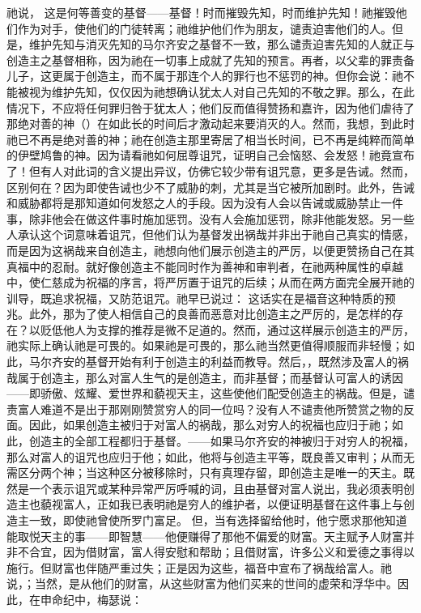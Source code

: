 祂说，  这是何等善变的基督——基督！时而摧毁先知，时而维护先知！祂摧毁他们作为对手，使他们的门徒转离；祂维护他们作为朋友，谴责迫害他们的人。但是，维护先知与消灭先知的马尔齐安之基督不一致，那么谴责迫害先知的人就正与创造主之基督相称，因为祂在一切事上成就了先知的预言。再者，以父辈的罪责备儿子，这更属于创造主，而不属于那连个人的罪行也不惩罚的神。但你会说：祂不能被视为维护先知，仅仅因为祂想确认犹太人对自己先知的不敬之罪。那么，在此情况下，不应将任何罪归咎于犹太人；他们反而值得赞扬和嘉许，因为他们虐待了那绝对善的神（）在如此长的时间后才激动起来要消灭的人。然而，我想，到此时祂已不再是绝对善的神；祂在创造主那里寄居了相当长时间，已不再是纯粹而简单的伊壁鸠鲁的神。因为请看祂如何屈尊诅咒，证明自己会恼怒、会发怒！祂竟宣布了！但有人对此词的含义提出异议，仿佛它较少带有诅咒意，更多是告诫。然而，区别何在？因为即使告诫也少不了威胁的刺，尤其是当它被所加剧时。此外，告诫和威胁都将是那知道如何发怒之人的手段。因为没有人会以告诫或威胁禁止一件事，除非他会在做这件事时施加惩罚。没有人会施加惩罚，除非他能发怒。另一些人承认这个词意味着诅咒，但他们认为基督发出祸哉并非出于祂自己真实的情感，而是因为这祸哉来自创造主，祂想向他们展示创造主的严厉，以便更赞扬自己在其真福中的忍耐。就好像创造主不能同时作为善神和审判者，在祂两种属性的卓越中，使仁慈成为祝福的序言，将严厉置于诅咒的后续；从而在两方面完全展开祂的训导，既追求祝福，又防范诅咒。祂早已说过：  这话实在是福音这种特质的预兆。此外，那为了使人相信自己的良善而恶意对比创造主之严厉的，是怎样的存在？以贬低他人为支撑的推荐是微不足道的。然而，通过这样展示创造主的严厉，祂实际上确认祂是可畏的。如果祂是可畏的，那么祂当然更值得顺服而非轻慢；如此，马尔齐安的基督开始有利于创造主的利益而教导。然后，，既然涉及富人的祸哉属于创造主，那么对富人生气的是创造主，而非基督；而基督认可富人的诱因——即骄傲、炫耀、爱世界和藐视天主，这些使他们配受创造主的祸哉。但是，谴责富人难道不是出于那刚刚赞赏穷人的同一位吗？没有人不谴责他所赞赏之物的反面。因此，如果创造主被归于对富人的祸哉，那么对穷人的祝福也应归于祂；如此，创造主的全部工程都归于基督。——如果马尔齐安的神被归于对穷人的祝福，那么对富人的诅咒也应归于他；如此，他将与创造主平等，既良善又审判；从而无需区分两个神；当这种区分被移除时，只有真理存留，即创造主是唯一的天主。既然是一个表示诅咒或某种异常严厉呼喊的词，且由基督对富人说出，我必须表明创造主也藐视富人，正如我已表明祂是穷人的维护者，以便证明基督在这件事上与创造主一致，即使祂曾使所罗门富足。 但，当有选择留给他时，他宁愿求那他知道能取悦天主的事——即智慧——他便赚得了那他不偏爱的财富。天主赋予人财富并非不合宜，因为借财富，富人得安慰和帮助；且借财富，许多公义和爱德之事得以施行。但财富也伴随严重过失；正是因为这些，福音中宣布了祸哉给富人。祂说，；当然，是从他们的财富，从这些财富为他们买来的世间的虚荣和浮华中。因此，在申命纪中，梅瑟说：  